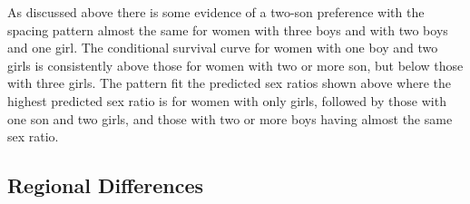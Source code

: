 \documentclass[12pt,letterpaper]{article}
\begin{document}
As discussed above there is some evidence of a two-son preference with
the spacing pattern almost the same for women with three boys and with
two boys and one girl.
The conditional survival curve for women with one boy and two girls is
consistently above those for women with two or more son, but below those 
with three girls.
The pattern fit the predicted sex ratios shown above where the highest
predicted sex ratio is for women with only girls, followed by those
with one son and two girls, and those with two or more boys having
almost the same sex ratio.

\FloatBarrier

\subsection{Regional Differences\label{sec:regional}}


\end{document}
